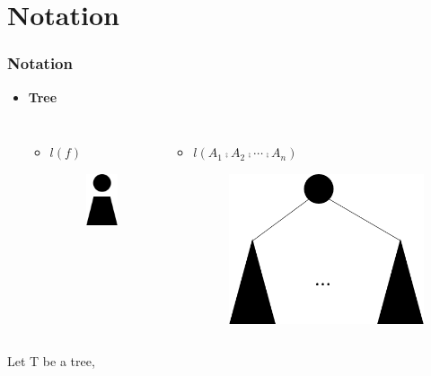 \documentclass{beamer}
\begin{document}
\section{Notation}
\begin{frame}
\frametitle{Notation}
\begin{itemize}
\item \textbf{Tree} 
\begin{columns}[c] %
\begin{itemize}
\item $l(f)$
\begin{figure}
	\includegraphics[width=0.2\linewidth]{Tree}
	\label{Tree} 
	\centering
\end{figure}
\end{itemize}
\begin{itemize}
\item $l(A_1 \comp A_2 \comp \cdots \comp A_n)$
\begin{figure}
	\includegraphics[width=0.5\linewidth]{Tree2}
	\label{Another Tree Representation} 
	\centering
\end{figure}
\end{itemize}
\end{columns}
\end{itemize}
Let T be a tree, 
\begin{columns}[c]
\begin{itemize}

\end{itemize}
\end{columns}
\end{frame}
\end{document}
